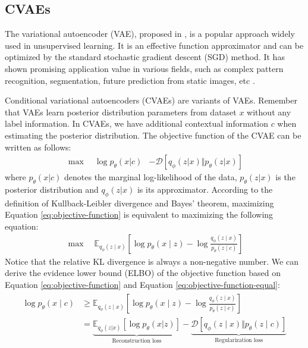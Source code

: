 \documentclass{article}
\begin{document}
\subsection{CVAEs}
The variational autoencoder (VAE), proposed in \cite{2022kingma}, is a popular approach widely used in unsupervised learning. It is an effective function approximator and can be optimized by the standard stochastic gradient descent (SGD) method. It has shown promising application value in various fields, such as complex pattern recognition, segmentation, future prediction from static images, etc \cite{2021doersch}.

Conditional variational autoencoders (CVAEs) are variants of VAEs. Remember that VAEs learn posterior distribution parameters from dataset $x$ without any label information. In CVAEs, we have additional contextual information $c$ when estimating the posterior distribution. The objective function of the CVAE can be written as follows:
\begin{align}
    \max\quad \log p_{\theta}\left(x|c\right) &- \mathcal{D}\left[q_{\phi} \left(z|x\right)\Vert p_{\theta}\left(z|x \right) \right] 
    \label{eq:objective-function}
\end{align}
where $p_\theta(x|c)$ denotes the marginal log-likelihood of the data, $p_\theta(z|x)$ is the posterior distribution and $q_\phi(z|x)$ is its approximator. According to the definition of Kullback-Leibler divergence and Bayes' theorem, maximizing Equation \ref{eq:objective-function} is equivalent to maximizing the following equation:
\begin{align}
    \max\quad \mathbb{E}_{q_{\phi}(z \mid x)}\left[\log p_{\theta}(x \mid z)-\log \frac{q_{\phi}(z \mid x)}{p_{\theta}(z \mid c)}\right]
    \label{eq:objective-function-equal}
\end{align}
Notice that the relative KL divergence is always a non-negative number. We can derive the evidence lower bound (ELBO) of the objective function based on Equation \ref{eq:objective-function} and Equation \ref{eq:objective-function-equal}:
\begin{align}
    \begin{split}
        \log p_{\theta}(x \mid c) &\geq \mathbb{E}_{q_{\phi}(z \mid x)}\left[\log p_{\theta}(x \mid z)-\log \frac{q_{\phi}(z \mid x)}{p_{\theta}(z \mid c)}\right]\\
                                  &= \underbrace{\mathbb{E}_{q_{\phi}(z|x)}\left[\log p_{\theta}\left(x|z \right)\right]}_{\text{Reconstruction loss}} - \underbrace{\mathcal{D}\left[q_{\phi}(z \mid x) \Vert p_{\theta}(z \mid c) \right]}_{\text{Regularization loss}}
    \end{split}
    \label{eq:elbo}
\end{align}
\end{document}
